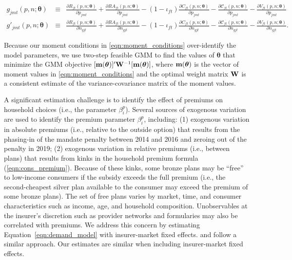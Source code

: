 \documentclass[12pt]{article}
\begin{document}
\vspace{-0.4in}
\begin{footnotesize}
\begin{eqnarray*}
	g_{jmt}(\textit{p},\textit{n};\boldsymbol{\theta}) &\equiv& \frac{\partial R_{ft}(\textit{p},\textit{n};\boldsymbol{\theta})}{\partial p_{jmt}} + \frac{\partial RA_{ft}(\textit{p},\textit{n};\boldsymbol{\theta})}{\partial p_{jmt}} - (1-\iota_{ft}) \frac{\partial C_{ft}(\textit{p},\textit{n};\boldsymbol{\theta})}{\partial p_{jmt}} - \frac{\partial \mathcal{C}_{ft}(\textit{p},\textit{n};\boldsymbol{\theta})}{\partial p_{jmt}} - \frac{\partial V_{ft}(\textit{p},\textit{n};\boldsymbol{\theta})}{\partial p_{jmt}} \\
	g'_{jmt}(\textit{p},\textit{n};\boldsymbol{\theta}) &\equiv& 	\frac{\partial R_{ft}(\textit{p},\textit{n};\boldsymbol{\theta})}{\partial n_{gjt}} + \frac{\partial RA_{ft}(\textit{p},\textit{n};\boldsymbol{\theta})}{\partial n_{gjt}} - (1-\iota_{ft}) \frac{\partial C_{ft}(\textit{p},\textit{n};\boldsymbol{\theta})}{\partial n_{gjt}} - \frac{\partial \mathcal{C}_{ft}(\textit{p},\textit{n};\boldsymbol{\theta})}{\partial n_{gjt}} - \frac{\partial V_{ft}(\textit{p},\textit{n};\boldsymbol{\theta})}{\partial n_{gjt}}.
\end{eqnarray*}
\end{footnotesize}
\vspace{-0.4in}

\noindent Because our moment conditions in \eqref{eqn:moment_conditions} over-identify the model parameters, we use two-step feasible GMM to find the values of $\boldsymbol{\theta}$ that minimize the GMM objective $[{\bf m}(\boldsymbol{\theta})]'{\bf W}^{-1}[{\bf m}(\boldsymbol{\theta})]$, where ${\bf m}(\boldsymbol{\theta})$ is the vector of moment values in \eqref{eqn:moment_conditions} and the optimal weight matrix ${\bf W}$ is a consistent estimate of the variance-covariance matrix of the moment values.  	
	
A significant estimation challenge is to identify the effect of premiums on household choices (i.e., the parameter $\beta_i^p$).  Several sources of exogenous variation are used to identify the premium parameter $\beta_i^p$, including: (1) exogenous variation in absolute premiums (i.e., relative to the outside option) that results from the phasing-in of the mandate penalty between 2014 and 2016 and zeroing out of the penalty in 2019; (2) exogenous variation in relative premiums (i.e., between plans) that results from kinks in the household premium formula (\ref{eqn:cons_premium}). Because of these kinks, some bronze plans may be ``free'' to low-income consumers if the subsidy exceeds the full premium (i.e., the second-cheapest silver plan available to the consumer may exceed the premium of some bronze plans).   The set of free plans varies by market, time, and consumer characteristics such as income, age, and household composition.  Unobservables at the insurer's discretion such as provider networks and formularies may also be correlated with premiums.  We address this concern by estimating Equation~\eqref{eqn:demand_model} with insurer-market fixed effects. \citet{Ho2014} and \citet{Tebaldi2020} follow a similar approach.  Our estimates are similar when including insurer-market fixed effects.
\end{document}
